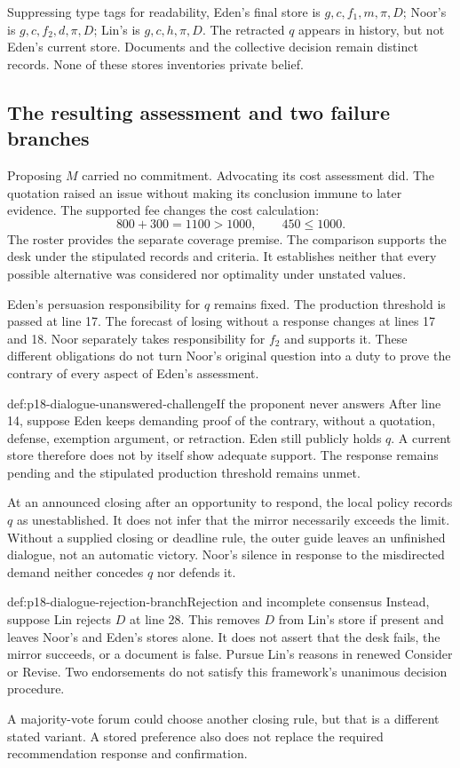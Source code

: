 Suppressing type tags for readability, Eden's final store is
\(g,c,f_1,m,\pi,D\); Noor's is \(g,c,f_2,d,\pi,D\);
Lin's is \(g,c,h,\pi,D\). The retracted \(q\) appears in history,
but not Eden's current store. Documents and the collective decision
remain distinct records. None of these stores inventories private belief.

\subsection{The resulting assessment and two failure branches}

Proposing \(M\) carried no commitment. Advocating its cost assessment
did. The quotation raised an issue without making its conclusion immune
to later evidence. The supported fee changes the cost calculation:
\[
800+300=1100>1000,\qquad 450\leq1000.
\]
The roster provides the separate coverage premise.
The comparison supports the desk under the stipulated records and
criteria. It establishes neither that every possible alternative
was considered nor optimality under unstated values.

Eden's persuasion responsibility for \(q\) remains fixed.
The production threshold is passed at line 17. The forecast of losing
without a response changes at lines 17 and 18. Noor separately takes
responsibility for \(f_2\) and supports it. These different obligations
do not turn Noor's original question into a duty to prove the contrary
of every aspect of Eden's assessment.

\begin{hbexample}{def:p18-dialogue-unanswered-challenge}{If the proponent never answers}
After line 14, suppose Eden keeps demanding proof of the contrary,
without a quotation, defense, exemption argument, or retraction.
Eden still publicly holds \(q\). A current store therefore does not
by itself show adequate support. The response remains pending and
the stipulated production threshold remains unmet.

At an announced closing after an opportunity to respond, the local
policy records \(q\) as unestablished. It does not infer that the
mirror necessarily exceeds the limit. Without a supplied closing
or deadline rule, the outer guide leaves an unfinished dialogue,
not an automatic victory. Noor's silence in response to the
misdirected demand neither concedes \(q\) nor defends it.
\end{hbexample}

\begin{hbexample}{def:p18-dialogue-rejection-branch}{Rejection and incomplete consensus}
Instead, suppose Lin rejects \(D\) at line 28. This removes \(D\)
from Lin's store if present and leaves Noor's and Eden's stores alone.
It does not assert that the desk fails, the mirror succeeds, or a
document is false. Pursue Lin's reasons in renewed Consider or Revise.
Two endorsements do not satisfy this framework's unanimous decision
procedure.

A majority-vote forum could choose another closing rule, but that is
a different stated variant. A stored preference also does not replace
the required recommendation response and confirmation.
\end{hbexample}

